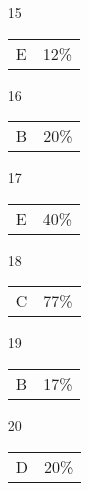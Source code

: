 \documentclass[12pt]{article}
\begin{document}
\begin{multicols}{5}
\begin{enumerate}
\item[15] \begin{tabular}{cc} E & 12\%\end{tabular}
\item[]
\item[16] \begin{tabular}{cc} B & 20\%\end{tabular}
\item[17] \begin{tabular}{cc} E & 40\%\end{tabular}
\item[18] \begin{tabular}{cc} C & 77\%\end{tabular}
\item[19] \begin{tabular}{cc} B & 17\%\end{tabular}
\item[20] \begin{tabular}{cc} D & 20\%\end{tabular}

\item[]


\end{enumerate}
\end{multicols}
\end{document}
